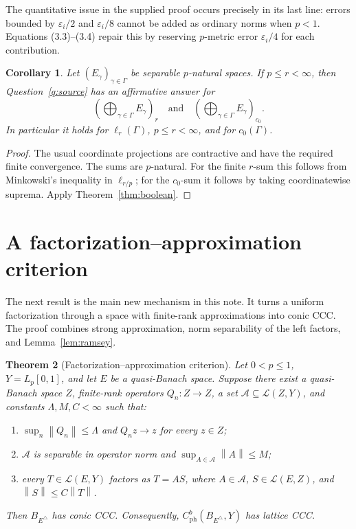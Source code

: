 \documentclass[11pt]{article}
\newtheorem{theorem}{Theorem}[section]
\newtheorem{corollary}[theorem]{Corollary}
\theoremstyle{definition}
\newcommand{\Lp}{L_p[0,1]}
\newcommand{\cph}{C_{\mathrm{ph}}^b}
\newcommand{\calL}{\mathcal L}
\newcommand{\calA}{\mathcal A}
\newcommand{\norm}[1]{\left\lVert #1\right\rVert}
\begin{document}
The quantitative issue in the supplied proof occurs precisely in its last line:
errors bounded by $\varepsilon_i/2$ and $\varepsilon_i/8$ cannot be added as
ordinary norms when $p<1$.  Equations (3.3)--(3.4) repair this by reserving
$p$-metric error $\varepsilon_i/4$ for each contribution.

\begin{corollary}
\label{cor:sums}
Let $(E_\gamma)_{\gamma\in\Gamma}$ be separable $p$-natural spaces.  If
$p\leq r<\infty$, then Question~\ref{q:source} has an affirmative answer for
\[
 \left(\bigoplus_{\gamma\in\Gamma}E_\gamma\right)_r
 \quad\text{and}\quad
 \left(\bigoplus_{\gamma\in\Gamma}E_\gamma\right)_{c_0}.
\]
In particular it holds for $\ell_r(\Gamma)$, $p\leq r<\infty$, and for
$c_0(\Gamma)$.
\end{corollary}

\begin{proof}
The usual coordinate projections are contractive and have the required finite
convergence.  The sums are $p$-natural.  For the finite $r$-sum this follows from
Minkowski's inequality in $\ell_{r/p}$; for the $c_0$-sum it follows by taking
coordinatewise suprema.  Apply Theorem~\ref{thm:boolean}.
\end{proof}

\section{A factorization--approximation criterion}

The next result is the main new mechanism in this note.  It turns a uniform
factorization through a space with finite-rank approximations into conic CCC.
The proof combines strong approximation, norm separability of the left factors,
and Lemma~\ref{lem:ramsey}.

\begin{theorem}[Factorization--approximation criterion]
\label{thm:factor}
Let $0<p\leq1$, $Y=\Lp$, and let $E$ be a quasi-Banach space.  Suppose there
exist a quasi-Banach space $Z$, finite-rank operators $Q_n:Z\to Z$, a set
$\calA\subseteq\calL(Z,Y)$, and constants $\Lambda,M,C<\infty$ such that:
\begin{enumerate}[label=\textup{(\alph*)}]
\item $\sup_n\norm{Q_n}\leq\Lambda$ and $Q_nz\to z$ for every $z\in Z$;
\item $\calA$ is separable in operator norm and
      $\sup_{A\in\calA}\norm{A}\leq M$;
\item every $T\in\calL(E,Y)$ factors as $T=AS$, where
      $A\in\calA$, $S\in\calL(E,Z)$, and
      $\norm{S}\leq C\norm{T}$.
\end{enumerate}
Then $B_{E^\triangle}$ has conic CCC.  Consequently,
$\cph(B_{E^\triangle},Y)$ has lattice CCC.
\end{theorem}
\end{document}
